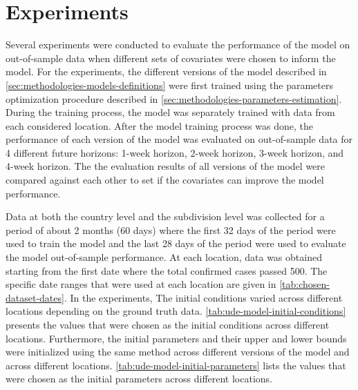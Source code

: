 \section{Experiments}
\label{sec:methodologies-experiments}

Several experiments were conducted to evaluate the performance of the model on out-of-sample data when different sets of covariates were chosen to inform the model.
For the experiments, the different versions of the model described in \autoref{sec:methodologies-models-definitions} were first trained using the parameters optimization procedure described in \autoref{sec:methodologies-parameters-estimation}.
During the training process, the model was separately trained with data from each considered location.
After the model training process was done, the performance of each version of the model was evaluated on out-of-sample data for 4 different future horizons: 1-week horizon, 2-week horizon, 3-week horizon, and 4-week horizon.
The the evaluation results of all versions of the model were compared against each other to set if the covariates can improve the model performance.

Data at both the country level and the subdivision level was collected for a period of about 2 months (60 days) where the first 32 days of the period were used to train the model and the last 28 days of the period were used to evaluate the model out-of-sample performance.
At each location, data was obtained starting from the first date where the total confirmed cases passed 500.
The specific date ranges that were used at each location are given in \autoref{tab:chosen-dataset-dates}.
In the experiments, The initial conditions varied across different locations depending on the ground truth data.
\autoref{tab:ude-model-initial-conditions} presents the values that were chosen as the initial conditions across different locations.
Furthermore, the initial parameters and their upper and lower bounds were initialized using the same method across different versions of the model and across different locations.
\autoref{tab:ude-model-initial-parameters} lists the values that were chosen as the initial parameters across different locations.

